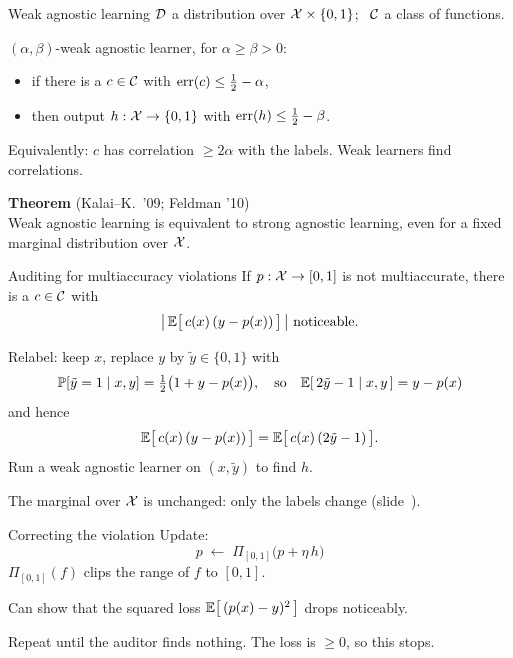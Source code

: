 \begin{frame}{Weak agnostic learning}
  $\mathcal{D}$ a distribution over $\mathcal{X} \times \{0,1\}$; \ $\mathcal{C}$ a class of functions.

  \vspace{0.6em}
  \alert{$(\alpha,\beta)$-weak agnostic learner}, for $\alpha \ge \beta > 0$:
  \begin{itemize}
    \item if there is a $c \in \mathcal{C}$ with $\mathrm{err}(c) \le \tfrac12 - \alpha$,
    \item then output $h : \mathcal{X} \to \{0,1\}$ with $\mathrm{err}(h) \le \tfrac12 - \beta$.
  \end{itemize}
  \textcolor{muted}{Equivalently: $c$ has correlation $\ge 2\alpha$ with the labels.
  Weak learners find correlations.}

  \pause
  \vspace{0.6em}
  \textbf{Theorem} \textcolor{muted}{(Kalai--\textcolor{ink}{K.}\ '09; Feldman '10)}\\
  Weak agnostic learning is equivalent to strong agnostic learning,
  \alert{even for a fixed marginal distribution over $\mathcal{X}$}.
\end{frame}

\begin{frame}{Auditing for multiaccuracy violations}
  If $p : \mathcal{X} \to [0,1]$ is not multiaccurate, there is a $c \in \mathcal{C}$ with
  \[
    \big|\,\E\big[\,c(x)\,(y - p(x))\,\big]\,\big| \ \text{noticeable.}
  \]

  \alert{Relabel}: keep $x$, replace $y$ by $\tilde y \in \{0,1\}$ with
  \[
    \mathbb{P}[\tilde y = 1 \mid x, y] = \tfrac12\big(1 + y - p(x)\big),
    \quad \text{so} \quad
    \mathbb{E}[\,2\tilde y - 1 \mid x, y\,] = y - p(x)
  \]
  and hence
  \[
    \mathbb{E}\big[\,c(x)\,(y - p(x))\,\big] = \mathbb{E}\big[\,c(x)\,(2\tilde y - 1)\,\big] .
  \]
  Run a weak agnostic learner on $(x, \tilde y)$ to find $h$.

  The \alert{marginal over $\mathcal{X}$ is unchanged}: only the labels change
  \textcolor{muted}{(slide~)}.

\end{frame}

\begin{frame}{Correcting the violation}
  Update:
  \[
    p \;\leftarrow\; \Pi_{[0,1]}\big(p + \eta\, h\big)
  \]
  \textcolor{muted}{$\Pi_{[0,1]}(f)$ clips the range of $f$ to $[0,1]$.}

  \vspace{0.5em}
  Can show that the squared loss $\mathbb{E}\big[\,(p(x) - y)^2\,\big]$ drops noticeably.

  \vspace{0.8em}
  Repeat until the auditor finds nothing. The loss is $\ge 0$,
  so \alert{this stops}.

\end{frame}

